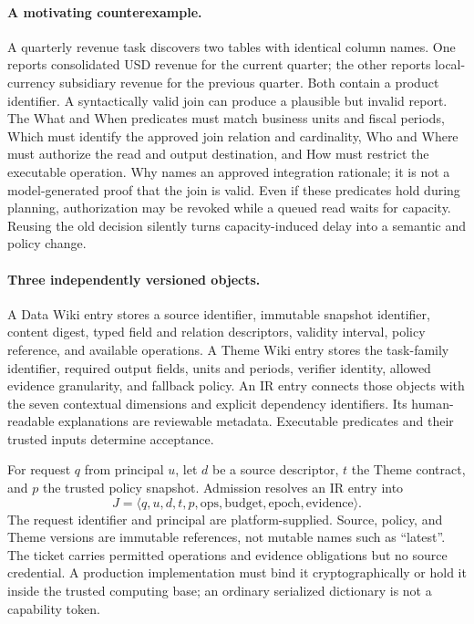 \paragraph{A motivating counterexample.}
A quarterly revenue task discovers two tables with identical column names. One reports consolidated USD revenue for the current quarter; the other reports local-currency subsidiary revenue for the previous quarter. Both contain a product identifier. A syntactically valid join can produce a plausible but invalid report. The What and When predicates must match business units and fiscal periods, Which must identify the approved join relation and cardinality, Who and Where must authorize the read and output destination, and How must restrict the executable operation. Why names an approved integration rationale; it is not a model-generated proof that the join is valid. Even if these predicates hold during planning, authorization may be revoked while a queued read waits for capacity. Reusing the old decision silently turns capacity-induced delay into a semantic and policy change.

\paragraph{Three independently versioned objects.}
A Data Wiki entry stores a source identifier, immutable snapshot identifier, content digest, typed field and relation descriptors, validity interval, policy reference, and available operations. A Theme Wiki entry stores the task-family identifier, required output fields, units and periods, verifier identity, allowed evidence granularity, and fallback policy. An IR entry connects those objects with the seven contextual dimensions and explicit dependency identifiers. Its human-readable explanations are reviewable metadata. Executable predicates and their trusted inputs determine acceptance.

For request $q$ from principal $u$, let $d$ be a source descriptor, $t$ the Theme contract, and $p$ the trusted policy snapshot. Admission resolves an IR entry into
\begin{equation}
J=\langle q,u,d,t,p,\mathrm{ops},\mathrm{budget},\mathrm{epoch},\mathrm{evidence}\rangle.
\end{equation}
The request identifier and principal are platform-supplied. Source, policy, and Theme versions are immutable references, not mutable names such as ``latest''. The ticket carries permitted operations and evidence obligations but no source credential. A production implementation must bind it cryptographically or hold it inside the trusted computing base; an ordinary serialized dictionary is not a capability token.

